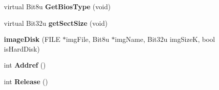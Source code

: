 \begin{DoxyCompactItemize}
\item 
\hypertarget{classimageDisk_a2ed19ea20ecd334122a6bee309a37918}{virtual Bit8u {\bfseries Get\-Bios\-Type} (void)}\label{classimageDisk_a2ed19ea20ecd334122a6bee309a37918}

\item 
\hypertarget{classimageDisk_ab408b88ad0133108ba8469638be88cc5}{virtual Bit32u {\bfseries get\-Sect\-Size} (void)}\label{classimageDisk_ab408b88ad0133108ba8469638be88cc5}

\item 
\hypertarget{classimageDisk_ad1149bdea114f2c61df5252f20638155}{{\bfseries image\-Disk} (F\-I\-L\-E $\ast$img\-File, Bit8u $\ast$img\-Name, Bit32u img\-Size\-K, bool is\-Hard\-Disk)}\label{classimageDisk_ad1149bdea114f2c61df5252f20638155}

\item 
\hypertarget{classimageDisk_a5291cb5aee8b109f4934fc1c24293e91}{int {\bfseries Addref} ()}\label{classimageDisk_a5291cb5aee8b109f4934fc1c24293e91}

\item 
\hypertarget{classimageDisk_a256b0cf2238f1364e3d9675242d69700}{int {\bfseries Release} ()}\label{classimageDisk_a256b0cf2238f1364e3d9675242d69700}

\end{DoxyCompactItemize}
